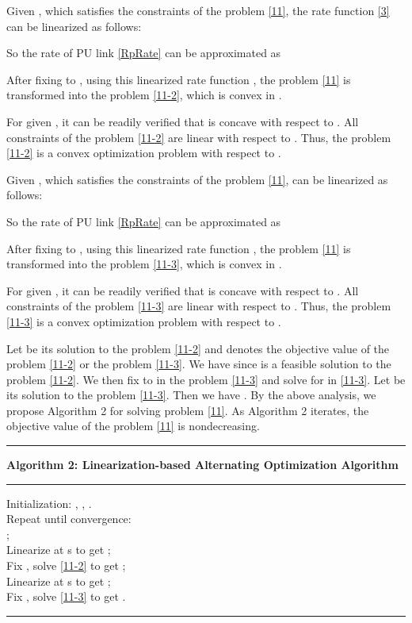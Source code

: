 \documentclass[12pt,onecolumn,tworows]{IEEEtran}
\begin{document}
Given , which satisfies the constraints of the problem \eqref{11},  the rate function \eqref{3} can be linearized as follows\cite{RuiZhangICL2012}:
 

So the rate of PU link \eqref{RpRate} can be approximated as




After fixing  to , using this linearized rate function , the problem \eqref{11} is transformed into the problem \eqref{11-2}, which is convex in .

For given ,  it can be readily verified that
 is concave with respect to
 . All constraints of the problem \eqref{11-2} are linear with respect to
 . Thus, the problem \eqref{11-2} is a convex optimization problem with respect to
 .



Given , which satisfies the constraints of the problem \eqref{11},   can be linearized as follows:

 
So the rate of PU link \eqref{RpRate} can be approximated as


After fixing  to , using this linearized rate function , the problem \eqref{11} is transformed into
the problem \eqref{11-3}, which is convex in .


For given ,  it can be readily verified that
 is concave with respect to
 . All constraints of the problem \eqref{11-3} are linear with respect to
 . Thus, the problem \eqref{11-3} is a convex optimization problem with respect to
 .


 Let  be its solution to the problem \eqref{11-2} and  denotes the objective value of the problem \eqref{11-2} or the problem \eqref{11-3}. We have  since  is a feasible solution to the problem \eqref{11-2}. We then fix  to  in the problem \eqref{11-3} and solve for  in \eqref{11-3}. Let  be its solution to the problem \eqref{11-3}. Then we have . By the above analysis, we propose Algorithm 2 for solving problem \eqref{11}.
As Algorithm 2 iterates, the objective value of the problem \eqref{11} is nondecreasing.


\noindent\rule{520pt}{1pt}
 \textbf{Algorithm 2: Linearization-based Alternating Optimization Algorithm}\\
 \noindent\rule{520pt}{0.65pt}
Initialization: , , .\\
Repeat until convergence:\\
 \indent  \indent ;\\
\indent \indent  Linearize  at s to get ;\\
\indent \indent  Fix , solve \eqref{11-2} to get ;\\
\indent \indent  Linearize  at s to get ;\\
\indent \indent  Fix , solve \eqref{11-3} to get .\\
 \noindent\rule{520pt}{1pt}
\end{document}
